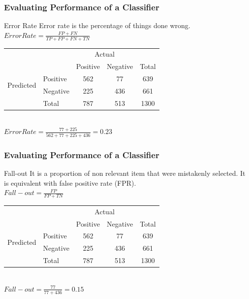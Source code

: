 \documentclass[serif,11pt,aspectratio=1610,table]{beamer}
\begin{document}
\begin{frame}
 \frametitle{Evaluating Performance of a Classifier}
\begin{block}{Error Rate}
 Error rate is the percentage of things done wrong.\\
\vspace{.5cm}
 $Error Rate = \frac{FP+FN}{TP+FP+FN+TN}$
\end{block}
\vspace{.5cm}
\begin{tabular}{|l|l|c|c|c|}
 \cline{3-5}
 \multicolumn{2}{c|}{}& \multicolumn{2}{c}{Actual}&\\
 \cline{3-5}
 \multicolumn{2}{c|}{}&Positive&Negative&Total\\
 \cline{1-5}
 \multirow{2}{*}{Predicted}& Positive & \cellcolor{orange!25}  562 & 77 & 639\\
 \cline{2-5}
 & Negative & 225 & \cellcolor{orange!25} 436 & 661\\
 \cline{2-5}
 & Total & 787 & 513 & 1300\\
\cline{1-5}
 \end{tabular} \\
\vspace{.5cm}
$Error Rate = \frac{77+225}{562+77+225+436} = 0.23$
\end{frame}
\begin{frame}
 \frametitle{Evaluating Performance of a Classifier}
\begin{block}{Fall-out}
 It is a proportion of non relevant item that were mistakenly selected. It is equivalent with false positive rate (FPR).\\
 \vspace{.5cm}
 $ Fall-out = \frac{FP}{FP + TN}$
\end{block}
\vspace{.5cm}
\begin{tabular}{|l|l|c|c|c|}
 \cline{3-5}
 \multicolumn{2}{c|}{}& \multicolumn{2}{c}{Actual}&\\
 \cline{3-5}
 \multicolumn{2}{c|}{}&Positive&Negative&Total\\
 \cline{1-5}
 \multirow{2}{*}{Predicted}& Positive & \cellcolor{orange!25}  562 & 77 & 639\\
 \cline{2-5}
 & Negative & 225 & \cellcolor{orange!25} 436 & 661\\
 \cline{2-5}
 & Total & 787 & 513 & 1300\\
\cline{1-5}
 \end{tabular} \\
\vspace{.5cm}
$Fall-out = \frac{77}{77+436} = 0.15$
\end{frame}
\end{document}
